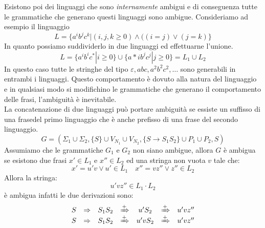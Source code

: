 Esistono poi dei linguaggi che sono \emph{internamente} ambigui e di conseguenza tutte le grammatiche che generano questi linguaggi sono ambigue. Consideriamo ad esempio il linguaggio 
$$L = \{a^ib^jc^k | (i,j,k\geq 0) \wedge ((i=j)\vee (j= k) \}$$
In quanto possiamo suddividerlo in due linguaggi ed effettuarne l'unione.
$$L = \{a^ib^ic^* |i \geq 0 \} \cup \{a*ib^jc^j |j \geq 0 \}= L_1 \cup L_2$$
In questo caso tutte le stringhe del tipo $ \varepsilon,abc,a^2b^2c^2,\dots $ sono generabili in entrambi i linguaggi. Questo comportamento è dovuto alla natura del linguaggio e in qualsiasi modo si modifichino le grammatiche che generano il comportamento delle frasi, l'ambiguità è inevitabile.\\
La concatenazione di due linguaggi può portare ambiguità se essiste un suffisso di una frasedel primo linguaggio che è anche prefisso di una frase del secondo linguaggio.
	$$G= (\Sigma_1 \cup \Sigma_2, \{S\}\cup V_{N_1} \cup V_{N_2}, \{S \rightarrow S_1S_2 \} \cup P_1\cup P_2, S)$$
Assumiamo che le grammatiche $ G_1 $ e $ G_2 $ non siano ambigue, allora $ G $ è ambigua se esistono due frasi $ x' \in L_1 $ e $ x'' \in L_2 $ ed una stringa non vuota $ v $ tale che:
$$x' = u'v \vee u'\in L_1 \quad x'' = vz'' \vee z'' \in L_2$$
Allora la stringa:
$$u'vz''\in L_1\cdot L_2$$
è ambigua infatti le due derivazioni sono:
$$
\begin{array}{ccccccc}
S & \Rightarrow & S_1S_2 & \xRightarrow{+} & u'S_2 & \xRightarrow{+} & u'vz''\\
S & \Rightarrow & S_1S_2 & \xRightarrow{+} & u'vS_2 & \xRightarrow{+} & u'vz''
\end{array}
$$
